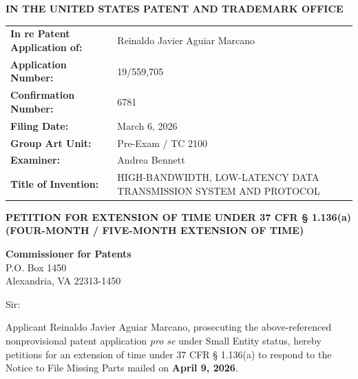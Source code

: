 \documentclass[11pt,letterpaper]{article}
\begin{document}
\thispagestyle{empty}

\begin{center}
    \large\textbf{IN THE UNITED STATES PATENT AND TRADEMARK OFFICE} \\
\end{center}

\vspace{0.3cm}
\noindent\begin{tabular}{p{2.3in}p{4.0in}}
\textbf{In re Patent Application of:} & Reinaldo Javier Aguiar Marcano \\
\textbf{Application Number:} & 19/559,705 \\
\textbf{Confirmation Number:} & 6781 \\
\textbf{Filing Date:} & March 6, 2026 \\
\textbf{Group Art Unit:} & Pre-Exam / TC 2100 \\
\textbf{Examiner:} & Andrea Bennett \\
\textbf{Title of Invention:} & HIGH-BANDWIDTH, LOW-LATENCY DATA TRANSMISSION SYSTEM AND PROTOCOL \\
\end{tabular}

\vspace{0.8cm}
\begin{center}
    \textbf{\large PETITION FOR EXTENSION OF TIME UNDER 37 CFR \S{} 1.136(a) \\
    (FOUR-MONTH / FIVE-MONTH EXTENSION OF TIME)}
\end{center}

\vspace{0.4cm}
\noindent\textbf{Commissioner for Patents} \\
\noindent P.O. Box 1450 \\
\noindent Alexandria, VA 22313-1450

\vspace{0.4cm}
\noindent Sir:

Applicant Reinaldo Javier Aguiar Marcano, prosecuting the above-referenced nonprovisional patent application \textit{pro se} under Small Entity status, hereby petitions for an extension of time under 37 CFR \S{} 1.136(a) to respond to the Notice to File Missing Parts mailed on \textbf{April 9, 2026}.
\end{document}
